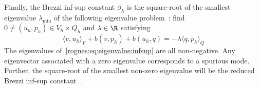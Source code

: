 Finally, the Brezzi inf-sup constant $\beta_h$ is the square-root of
the smallest eigenvalue $\lambda_{\min}$ of the following eigenvalue
problem~\cite{Malkus1981, Qin1994}: find $0 \not = (u_h,
p_h) \in V_h \times Q_h$ and $\lambda \in \R$ satisfying
\begin{equation}
  \label{rognes:eq:eigenvalue:infsup}
  \langle v, u_h \rangle_{V} + b(v, p_h) + b(u_h, q) = - \lambda
  \langle q, p_h \rangle_{Q}
\end{equation}
The eigenvalues of~\eqref{rognes:eq:eigenvalue:infsup} are all non-negative.
Any eigenvector associated with a zero eigenvalue corresponds to a
spurious mode. Further, the square-root of the smallest non-zero
eigenvalue will be the reduced Brezzi inf-sup
constant~\cite{Qin1994}.


